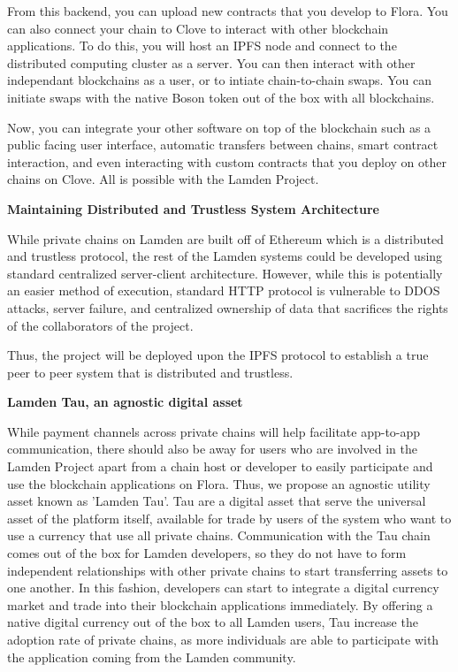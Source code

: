 \documentclass{%
	article}
\begin{document}
From this backend, you can upload new contracts that you develop to Flora. You can also connect your chain to Clove to interact with other blockchain applications. To do this, you will host an IPFS node and connect to the distributed computing cluster as a server. You can then interact with other independant blockchains as a user, or to intiate chain-to-chain swaps. You can initiate swaps with the native Boson token out of the box with all blockchains.

Now, you can integrate your other software on top of the blockchain such as a public facing user interface, automatic transfers between chains, smart contract interaction, and even interacting with custom contracts that you deploy on other chains on Clove. All is possible with the Lamden Project.

\begin{center}
\textbf{Maintaining Distributed and Trustless System Architecture}
\end{center}

While private chains on Lamden are built off of Ethereum which is a distributed and trustless protocol, the rest of the Lamden systems could be developed using standard centralized server-client architecture. However, while this is potentially an easier method of execution, standard HTTP protocol is vulnerable to DDOS attacks, server failure, and centralized ownership of data that sacrifices the rights of the collaborators of the project\cite{symantecreport}.

Thus, the project will be deployed upon the IPFS protocol to establish a true peer to peer system that is distributed and trustless.

\begin{center}
\textbf{Lamden Tau, an agnostic digital asset}
\end{center}

While payment channels across private chains will help facilitate app-to-app communication, there should also be away for users who are involved in the Lamden Project apart from a chain host or developer to easily participate and use the blockchain applications on Flora. Thus, we propose an agnostic utility asset known as 'Lamden Tau'. Tau are a digital asset that serve the universal asset of the platform itself, available for trade by users of the system who want to use a currency that use all private chains. Communication with the Tau chain comes out of the box for Lamden developers, so they do not have to form independent relationships with other private chains to start transferring assets to one another. In this fashion, developers can start to integrate a digital currency market and trade into their blockchain applications immediately. By offering a native digital currency out of the box to all Lamden users, Tau increase the adoption rate of private chains, as more individuals are able to participate with the application coming from the Lamden community.
\end{document}
